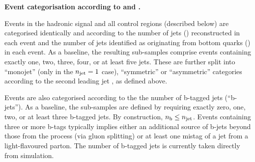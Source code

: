 {\bf Event categorisation according to \njet and \nb.} 

Events in the hadronic signal and all control regions (described
below) are categorised identically and according to the number of jets
(\njet) reconstructed in each event and the number of jets identified
as originating from bottom quarks (\nb) in each event. As a baseline,
the resulting sub-samples comprise events containing exactly one, two,
three, four, or at least five jets. These are further split into
``monojet'' (only in the $n_{\text{jet}}=1$ case),
``symmetric'' or ``asymmetric'' \njet categories according to the
second leading jet \Pt, as defined above.

Events are also categorised according to the the number of b-tagged
jets (``b-jets''). As a baseline, the sub-samples are defined by
requiring exactly zero, one, two, or at least three b-tagged jets. By
construction, $n_{\text{b}} \leq n_{\text{jet}}$. Events containing three or more b-tags
typically implies either an additional source of b-jets beyond those
from the \ttbar process (\eg via gluon splitting) or at least one
mistag of a jet from a light-flavoured parton. The number of b-tagged
jets is currently taken directly from simulation.




